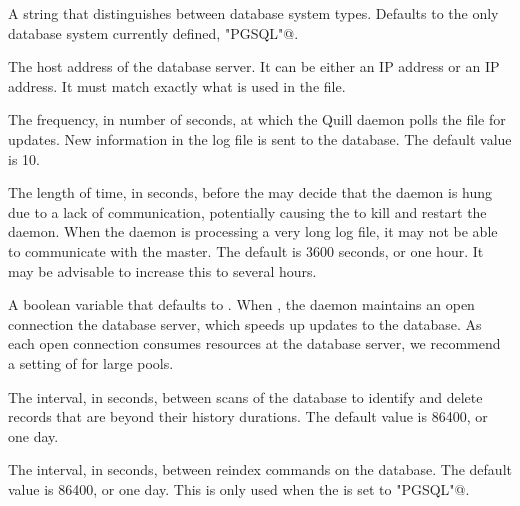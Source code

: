\begin{description}
\label{param:QuillDBType}
\item[\Macro{QUILL\_DB\_TYPE}]
  A string that distinguishes between database system types.
  Defaults to the only database system currently defined,
  \verb@"PGSQL"@.

\label{param:QuillDBIPAddr}
\item[\Macro{QUILL\_DB\_IP\_ADDR}]
  The host address of the database server. It can be either an IP address
  or an IP address.
  It must match exactly what is used in the  file.

\label{param:QuillPollingPeriod}
\item[\Macro{QUILL\_POLLING\_PERIOD}]
  The frequency, in number of seconds, at which the Quill daemon
  polls the file  for updates.
  New information in the log file is sent to the database.
  The default value is 10.

\label{param:QuillNotRespondingTimeout}
\item[\Macro{QUILL\_NOT\_RESPONDING\_TIMEOUT}]
  The length of time, in seconds, before the 
  may decide that the  daemon is hung due to 
  a lack of communication,
  potentially causing  the  to kill and
  restart the  daemon.
  When the  daemon is processing a very long log file, it 
  may not be able to communicate with the master. 
  The default is 3600 seconds, or one hour. It may be
  advisable to increase this to several hours. 

\label{param:QuillMaintainDBConn}
\item[\Macro{QUILL\_MAINTAIN\_DB\_CONN}]
  A boolean variable that defaults to .
  When , the  daemon
  maintains an open connection the database server,
  which speeds up updates to the database.
  As each open connection consumes resources at the database server,
  we recommend a setting of  for large pools.

\label{param:QuillDatabasePurgeInterval}
\item[\Macro{DATABASE\_PURGE\_INTERVAL}] 
  The interval, in seconds, between scans of the database to identify and
  delete records that are beyond their history durations. 
  The default value is 86400, or one day.

\label{param:QuillDatabaseReindexInterval}
\item[\Macro{DATABASE\_REINDEX\_INTERVAL}] 
  The interval, in seconds, between reindex commands on the database.
  The default value is 86400, or one day.
  This is only used when the  is set to
  \verb@"PGSQL"@.


\end{description}
